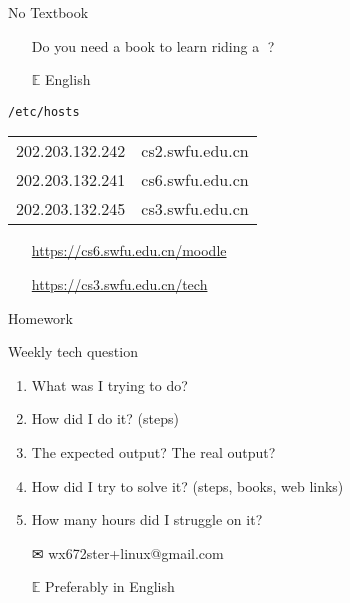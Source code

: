 \begin{frame}{No Textbook}%
  \begin{itemize}
  \item[\nerd{}] Do you need a book to learn riding a\hspace{.5ex} {\nerd }?
  \item[{\GG}]\google
  \item[$\mathbb{E}$] {\purisa English}
  \end{itemize}
  \begin{block}{\texttt{/etc/hosts}}%
    \begin{center}\ttfamily
      \begin{tabular}{ll}
        202.203.132.242&cs2.swfu.edu.cn\\
        202.203.132.241&cs6.swfu.edu.cn\\
        202.203.132.245&cs3.swfu.edu.cn
      \end{tabular}
    \end{center}
    \begin{itemize}
    \item[]\moodle\quad\url{https://cs6.swfu.edu.cn/moodle}
    \item[]{\small\openbook}\quad\url{https://cs3.swfu.edu.cn/tech}
    \end{itemize}
  \end{block}
\end{frame}

\begin{frame}{Homework}
  \begin{block}{Weekly tech question}
    \begin{enumerate}
    \item What was I trying to do?
    \item How did I do it? (steps)
    \item The expected output? The real output?
    \item How did I try to solve it? (steps, books, web links)
    \item How many hours did I struggle on it?
    \end{enumerate}
  \end{block}
  \begin{itemize}
  \item[\Large\dejavu ✉] \alert{\ttfamily wx672ster+linux@gmail.com}
  \item[$\mathbb{E}$] Preferably in English
  \end{itemize}
\end{frame}

